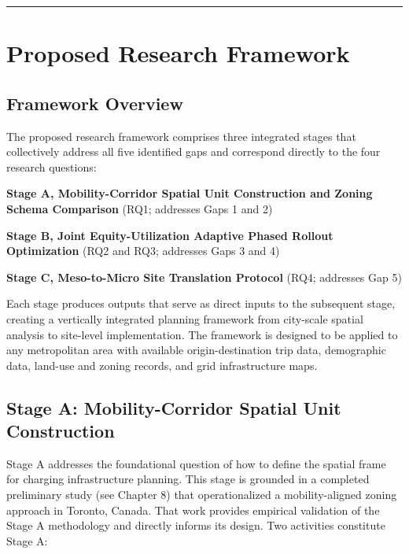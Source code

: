 \documentclass[letterpaper, 12pt, oneside, doublespacing]{Thesis}
\begin{document}
\bigskip\noindent\rule{\linewidth}{0.4pt}\bigskip


\chapter{Proposed Research Framework}

\section{Framework Overview}

The proposed research framework comprises three integrated stages that collectively address all five identified gaps and correspond directly to the four research questions:


\noindent \textbf{Stage A, Mobility-Corridor Spatial Unit Construction and Zoning Schema Comparison} (RQ1; addresses Gaps 1 and 2)



\noindent \textbf{Stage B, Joint Equity-Utilization Adaptive Phased Rollout Optimization} (RQ2 and RQ3; addresses Gaps 3 and 4)



\noindent \textbf{Stage C, Meso-to-Micro Site Translation Protocol} (RQ4; addresses Gap 5)


Each stage produces outputs that serve as direct inputs to the subsequent stage, creating a vertically integrated planning framework from city-scale spatial analysis to site-level implementation. The framework is designed to be applied to any metropolitan area with available origin-destination trip data, demographic data, land-use and zoning records, and grid infrastructure maps.

\section{Stage A: Mobility-Corridor Spatial Unit Construction}

Stage A addresses the foundational question of how to define the spatial frame for charging infrastructure planning. This stage is grounded in a completed preliminary study (see Chapter 8) that operationalized a mobility-aligned zoning approach in Toronto, Canada. That work provides empirical validation of the Stage A methodology and directly informs its design. Two activities constitute Stage A:
\end{document}
